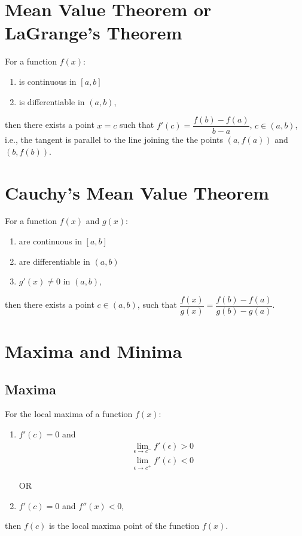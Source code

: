 \documentclass[openany, oneside]{book}
\begin{document}
\section{Mean Value Theorem or LaGrange's Theorem}
For a function $f(x)$:
\begin{enumerate}
\item is continuous in $[a,b]$
\item is differentiable in $(a,b)$,
\end{enumerate}
then there exists a point $x=c$ such that $f'(c)=\dfrac{f(b)-f(a)}{b-a}$, $c\in(a,b)$, i.e., the tangent is parallel to the line joining the the points $(a,f(a))$ and $(b,f(b))$.

\section{Cauchy's Mean Value Theorem}
For a function $f(x)$ and $g(x)$:
\begin{enumerate}
\item are continuous in $[a,b]$
\item are differentiable in $(a,b)$
\item $g'(x)\neq 0$ in $(a,b)$,
\end{enumerate}
then there exists a point $c\in(a,b)$, such that $\dfrac{f(x)}{g(x)}=\dfrac{f(b)-f(a)}{g(b)-g(a)}$.

\section{Maxima and Minima}
\subsection{Maxima}
For the local maxima of a function $f(x)$:
\begin{enumerate}
\item $f'(c)=0$ and
\begin{align}
\lim_{\epsilon\to c^{-}} f'(\epsilon)>0\nonumber\\
\lim_{\epsilon\to c^{+}} f'(\epsilon)<0\nonumber
\end{align}
\begin{center}
OR
\end{center}
\item $f'(c)=0$ and $f''(x)<0$,
\end{enumerate}
then $f(c)$ is the local maxima point of the function $f(x)$.
\end{document}
